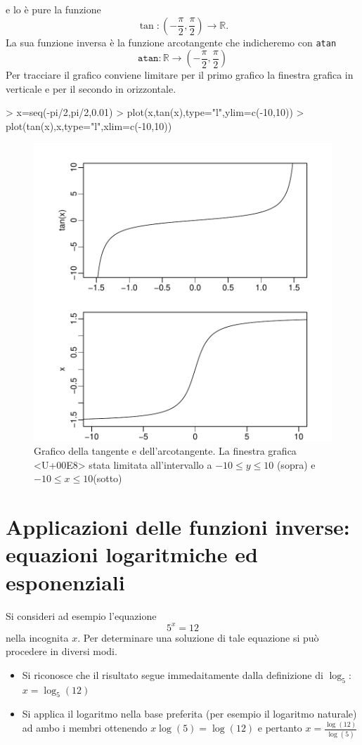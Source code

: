 \documentclass[onecolumn,11pt]{book}
\begin{document}
e lo \`e pure la funzione
$$\tan\colon (-\frac{\pi}2 ,\frac{\pi}2)\rightarrow \mathbb{R}.$$
La sua funzione inversa \`e  la funzione arcotangente che indicheremo con \texttt{atan}
$$\texttt{atan}\colon  \mathbb R \rightarrow (-\frac{\pi}{2},\frac{\pi}{2})$$
Per tracciare il grafico conviene limitare per il primo grafico la finestra grafica in verticale e per il secondo in orizzontale.
\begin{Schunk}
\begin{Sinput}
> x=seq(-pi/2,pi/2,0.01)
> plot(x,tan(x),type="l",ylim=c(-10,10))
> plot(tan(x),x,type="l",xlim=c(-10,10))
\end{Sinput}
\end{Schunk}
\begin{center}\begin{figure}

\includegraphics{Rmatematica-101}
\caption{Grafico della tangente e dell'arcotangente. La finestra grafica <U+00E8> stata limitata all'intervallo a $-10\leq y\leq 10$  (sopra) e 
$-10\leq x\leq 10 $(sotto)}
\end{figure}

\end{center}
\section{Applicazioni delle funzioni inverse: equazioni logaritmiche ed esponenziali}
Si consideri ad esempio l'equazione
\[ 5^{x}=12\]
nella incognita $x$.
Per determinare una soluzione di tale equazione si pu\`o procedere in diversi modi.
\begin{itemize}
\item Si riconosce che il risultato segue immedaitamente dalla definizione di $\log_5$: 
$x=\log_5(12)$
\item Si applica il logaritmo nella base preferita (per esempio il logaritmo naturale)  ad ambo i membri ottenendo
$x\log(5)=\log(12)$ e pertanto $x=\frac{\log(12)}{\log(5)}$
\end{itemize}
\end{document}
